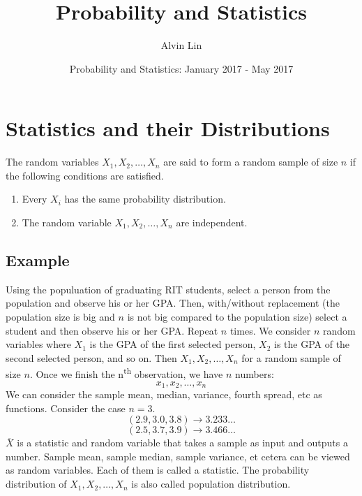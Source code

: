 \documentclass[letterpaper, 12pt]{math}
\title{Probability and Statistics}
\author{Alvin Lin}
\date{Probability and Statistics: January 2017 - May 2017}
\begin{document}
\maketitle

\section*{Statistics and their Distributions}
The random variables \( X_{1},X_{2},\dots,X_{n} \) are said to form a random
sample of size \( n \) if the following conditions are satisfied.
\begin{enumerate}
  \item Every \( X_{i} \) has the same probability distribution.
  \item The random variable \( X_{1},X_{2},\dots,X_{n} \) are independent.
\end{enumerate}

\subsection*{Example}
Using the populuation of graduating RIT students, select a person from the
population and observe his or her GPA. Then, with/without replacement (the
population size is big and \( n \) is not big compared to the population
size) select a student and then observe his or her GPA. Repeat \( n \)
times. We consider \( n \) random variables where \( X_{1} \) is the GPA of
the first selected person, \( X_{2} \) is the GPA of the second selected
person, and so on. Then \( X_{1},X_{2},\dots,X_{n} \) for a random sample of
size \( n \). Once we finish the n\textsuperscript{th} observation, we
have \( n \) numbers:
\[ x_{1},x_{2},\dots,x_{n} \]
We can consider the sample mean, median, variance, fourth spread, etc as
functions. Consider the case \( n = 3 \).
\[ (2.9,3.0,3.8)\to3.233\dots \]
\[ (2.5,3.7,3.9)\to3.466\dots \]
\( \overline{X} \) is a statistic and random variable that takes a sample as
input and outputs a number. Sample mean, sample median, sample variance, et
cetera can be viewed as random variables. Each of them is called a
statistic. The probability distribution of \( X_{1},X_{2},\dots,X_{n} \) is
also called population distribution.
\end{document}
